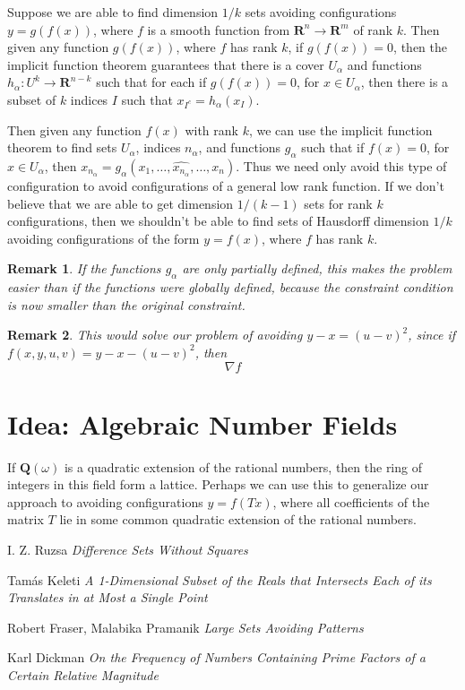 \documentclass{report}
\theoremstyle{plain}
\theoremstyle{plain}
\newtheorem*{remark}{Remark}
\begin{document}
Suppose we are able to find dimension $1/k$ sets avoiding configurations $y = g(f(x))$, where $f$ is a smooth function from $\mathbf{R}^n \to \mathbf{R}^m$ of rank $k$. Then given any function $g(f(x))$, where $f$ has rank $k$, if $g(f(x)) = 0$, then the implicit function theorem guarantees that there is a cover $U_\alpha$ and functions $h_\alpha: U^k \to \mathbf{R}^{n-k}$ such that for each if $g(f(x)) = 0$, for $x \in U_\alpha$, then there is a subset of $k$ indices $I$ such that $x_{I^c} = h_\alpha(x_I)$.

Then given any function $f(x)$ with rank $k$, we can use the implicit function theorem to find sets $U_\alpha$, indices $n_\alpha$, and functions $g_\alpha$ such that if $f(x) = 0$, for $x \in U_\alpha$, then $x_{n_\alpha} = g_\alpha(x_1, \dots, \widehat{x_{n_\alpha}}, \dots, x_n)$. Thus we need only avoid this type of configuration to avoid configurations of a general low rank function. If we don't believe that we are able to get dimension $1/(k-1)$ sets for rank $k$ configurations, then we shouldn't be able to find sets of Hausdorff dimension $1/k$ avoiding configurations of the form $y = f(x)$, where $f$ has rank $k$. 

\begin{remark}
    If the functions $g_\alpha$ are only partially defined, this makes the problem easier than if the functions were globally defined, because the constraint condition is now smaller than the original constraint.
\end{remark}

\begin{remark}
    This would solve our problem of avoiding $y - x = (u - v)^2$, since if $f(x,y,u,v) = y - x - (u - v)^2$, then
    \[ \nabla f \]
\end{remark}

\section{Idea: Algebraic Number Fields}

If $\mathbf{Q}(\omega)$ is a quadratic extension of the rational numbers, then the ring of integers in this field form a lattice. Perhaps we can use this to generalize our approach to avoiding configurations $y = f(Tx)$, where all coefficients of the matrix $T$ lie in some common quadratic extension of the rational numbers.

\begin{thebibliography}{9}

I. Z. Ruzsa
\textit{Difference Sets Without Squares}

Tam\'{a}s Keleti
\textit{A 1-Dimensional Subset of the Reals that Intersects Each of its Translates in at Most a Single Point}

Robert Fraser, Malabika Pramanik
\textit{Large Sets Avoiding Patterns}

Karl Dickman
\textit{On the Frequency of Numbers Containing Prime Factors of a Certain Relative Magnitude}

\end{thebibliography}
\end{document}
